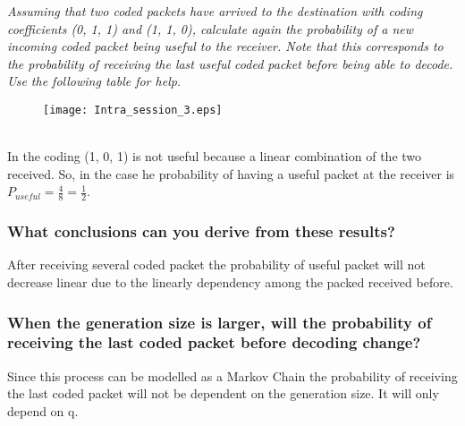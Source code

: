 \textit{Assuming that two coded packets have arrived to the destination with coding coefficients (0, 1, 1) and (1, 1, 0), calculate again the probability of a new incoming coded packet being useful to the receiver. Note that this corresponds to the probability of receiving the last useful coded packet before being able to decode. Use the following table for help.}\\
\begin{figure}[!h]
  \centering
  \texttt{[image: Intra\_session\_3.eps]}
  \caption{}
  \label{fig:Intra_session_3}
\end{figure}\\

In  the coding (1, 0, 1) is not useful because a linear combination of the two received. So, in the case he probability of having a useful packet at the receiver is $P_{useful}=\frac{4}{8}=\frac{1}{2}$.\\
\FloatBarrier

\subsubsection{What conclusions can you derive from these results?}
After receiving several coded packet the probability of useful packet will not decrease linear due to the linearly dependency among the packed received before. 

\subsubsection{When the generation size is larger, will the probability of receiving the last coded packet before decoding change?}

Since this process can be modelled as a Markov Chain the probability of receiving the last coded packet will not be dependent on the generation size. It will only depend on q.

